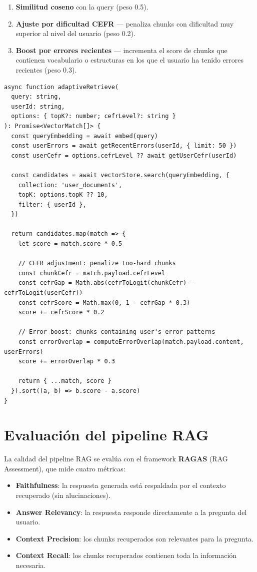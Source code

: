 \documentclass[10pt,a4paper,oneside]{report}
\begin{document}
\begin{enumerate}[leftmargin=1.6em]
\item \textbf{Similitud coseno} con la query (peso 0.5).
\item \textbf{Ajuste por dificultad CEFR} — penaliza chunks con dificultad muy superior al nivel del usuario (peso 0.2).
\item \textbf{Boost por errores recientes} — incrementa el score de chunks que contienen vocabulario o estructuras en los que el usuario ha tenido errores recientes (peso 0.3).
\end{enumerate}

\begin{lstlisting}[style=ts,caption={Recuperación adaptativa}]
async function adaptiveRetrieve(
  query: string,
  userId: string,
  options: { topK?: number; cefrLevel?: string }
): Promise<VectorMatch[]> {
  const queryEmbedding = await embed(query)
  const userErrors = await getRecentErrors(userId, { limit: 50 })
  const userCefr = options.cefrLevel ?? await getUserCefr(userId)

  const candidates = await vectorStore.search(queryEmbedding, {
    collection: 'user_documents',
    topK: options.topK ?? 10,
    filter: { userId },
  })

  return candidates.map(match => {
    let score = match.score * 0.5

    // CEFR adjustment: penalize too-hard chunks
    const chunkCefr = match.payload.cefrLevel
    const cefrGap = Math.abs(cefrToLogit(chunkCefr) - cefrToLogit(userCefr))
    const cefrScore = Math.max(0, 1 - cefrGap * 0.3)
    score += cefrScore * 0.2

    // Error boost: chunks containing user's error patterns
    const errorOverlap = computeErrorOverlap(match.payload.content, userErrors)
    score += errorOverlap * 0.3

    return { ...match, score }
  }).sort((a, b) => b.score - a.score)
}
\end{lstlisting}

\section{Evaluación del pipeline RAG}
La calidad del pipeline RAG se evalúa con el framework \textbf{RAGAS} (RAG Assessment), que mide cuatro métricas:

\begin{itemize}[leftmargin=1.4em]
\item \textbf{Faithfulness}: la respuesta generada está respaldada por el contexto recuperado (sin alucinaciones).
\item \textbf{Answer Relevancy}: la respuesta responde directamente a la pregunta del usuario.
\item \textbf{Context Precision}: los chunks recuperados son relevantes para la pregunta.
\item \textbf{Context Recall}: los chunks recuperados contienen toda la información necesaria.
\end{itemize}
\end{document}
